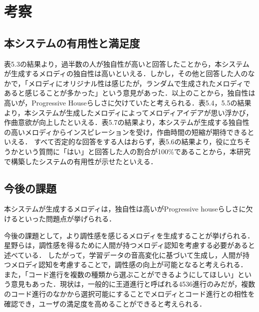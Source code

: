 \chapter{考察}
\section{本システムの有用性と満足度}
表5.3の結果より，過半数の人が独自性が高いと回答したことから，本システムが生成するメロディの独自性は高いといえる．しかし，その他と回答した人のなかで，「メロディにオリジナル性は感じたが，ランダムで生成されたメロディであると感じることが多かった」という意見があった．以上のことから，独自性は高いが，Progressive Houseらしさに欠けていたと考えられる．表5.4，5.5の結果より，本システムが生成したメロディによってメロディアイデアが思い浮かび，作曲意欲が向上したといえる．表5.7の結果より，本システムが生成する独自性の高いメロディからインスピレーションを受け，作曲時間の短縮が期待できるといえる．
すべて否定的な回答をする人はおらず，表5.6の結果より，役に立ちそうかという質問に「はい」と回答した人の割合が100\%であることから，本研究で構築したシステムの有用性が示せたといえる．
\section{今後の課題}
本システムが生成するメロディは，独自性は高いがProgressive houseらしさに欠けるといった問題点が挙げられる．

今後の課題として，より調性感を感じるメロディを生成することが挙げられる．
星野らは，調性感を得るために人間が持つメロディ認知を考慮する必要があると述べている\cite{Hoshino84}．
したがって，学習データの音高変化に基づいて生成し，人間が持つメロディ認知を考慮することで，調性感の向上が可能となると考えられる．
また，「コード進行を複数の種類から選ぶことができるようにしてほしい」という意見もあった．現状は，一般的に王道進行と呼ばれる4536進行のみだが，複数のコード進行のなかから選択可能にすることでメロディとコード進行との相性を確認でき，ユーザの満足度を高めることができると考えられる．
